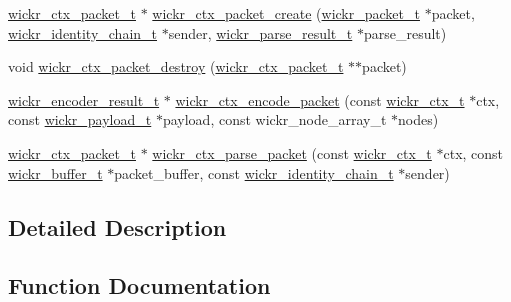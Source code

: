 \begin{DoxyCompactItemize}
\mbox{\hyperlink{structwickr__ctx__packet}{wickr\+\_\+ctx\+\_\+packet\+\_\+t}} $\ast$ \mbox{\hyperlink{group__wickr__ctx_ga8ac1e1c9a0b9802d7f259278a09df56c}{wickr\+\_\+ctx\+\_\+packet\+\_\+create}} (\mbox{\hyperlink{structwickr__packet}{wickr\+\_\+packet\+\_\+t}} $\ast$packet, \mbox{\hyperlink{structwickr__identity__chain}{wickr\+\_\+identity\+\_\+chain\+\_\+t}} $\ast$sender, \mbox{\hyperlink{structwickr__parse__result}{wickr\+\_\+parse\+\_\+result\+\_\+t}} $\ast$parse\+\_\+result)
\item 
void \mbox{\hyperlink{group__wickr__ctx_gad7063bcfca4878d290e598ed6bc22e3c}{wickr\+\_\+ctx\+\_\+packet\+\_\+destroy}} (\mbox{\hyperlink{structwickr__ctx__packet}{wickr\+\_\+ctx\+\_\+packet\+\_\+t}} $\ast$$\ast$packet)
\item 
\mbox{\hyperlink{structwickr__encoder__result}{wickr\+\_\+encoder\+\_\+result\+\_\+t}} $\ast$ \mbox{\hyperlink{group__wickr__ctx_ga3498fb1a966dd49c1f3b806a388533ea}{wickr\+\_\+ctx\+\_\+encode\+\_\+packet}} (const \mbox{\hyperlink{structwickr__ctx}{wickr\+\_\+ctx\+\_\+t}} $\ast$ctx, const \mbox{\hyperlink{structwickr__payload}{wickr\+\_\+payload\+\_\+t}} $\ast$payload, const wickr\+\_\+node\+\_\+array\+\_\+t $\ast$nodes)
\item 
\mbox{\hyperlink{structwickr__ctx__packet}{wickr\+\_\+ctx\+\_\+packet\+\_\+t}} $\ast$ \mbox{\hyperlink{group__wickr__ctx_ga5032fb65627a509fd9486ea9696e643d}{wickr\+\_\+ctx\+\_\+parse\+\_\+packet}} (const \mbox{\hyperlink{structwickr__ctx}{wickr\+\_\+ctx\+\_\+t}} $\ast$ctx, const \mbox{\hyperlink{structwickr__buffer}{wickr\+\_\+buffer\+\_\+t}} $\ast$packet\+\_\+buffer, const \mbox{\hyperlink{structwickr__identity__chain}{wickr\+\_\+identity\+\_\+chain\+\_\+t}} $\ast$sender)
\end{DoxyCompactItemize}


\subsection{Detailed Description}


\subsection{Function Documentation}
\mbox{\label{group__wickr__ctx_gaeff6704dded2d44f689eca5ad25843f8}} 
